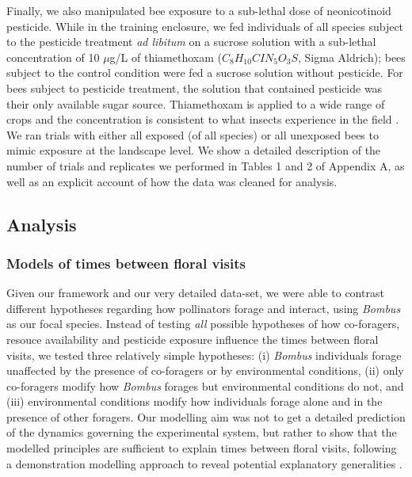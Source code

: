 \begin{refsection}
Finally, we also manipulated bee exposure to a sub-lethal dose of neonicotinoid pesticide. While in the training enclosure, we fed individuals of all species subject to the pesticide treatment \textit{ad libitum} on a sucrose solution with a sub-lethal concentration of 10 $\mu$g/L of thiamethoxam ($C_{8}H_{10}CIN_{5}O_{3}S$, Sigma Aldrich); bees subject to the control condition were fed a sucrose solution without pesticide. For bees subject to pesticide treatment, the solution that contained pesticide was their only available sugar source. Thiamethoxam is applied to a wide range of crops \citep{maienfisch_chemistry_2001} and the concentration is consistent to what insects experience in the field \citep{blacquiere_neonicotinoids_2012}. We ran trials with either all exposed (of all species) or all unexposed bees to mimic exposure at the landscape level. We show a detailed description of the number of trials and replicates we performed in Tables 1 and 2 of Appendix A, as well as an explicit account of how the data was cleaned for analysis.

\subsection*{Analysis}

\subsubsection*{Models of times between floral visits}

Given our framework and our very detailed data-set, we were able to contrast different hypotheses regarding how pollinators forage and interact, using \textit{Bombus} as our focal species. Instead of testing \textit{all} possible hypotheses of how co-foragers, resouce availability and pesticide exposure influence the times between floral visits, we tested three relatively simple hypotheses: (i) \textit{Bombus} individuals forage unaffected by the presence of co-foragers or by environmental conditions, (ii) only co-foragers modify how \textit{Bombus} forages but environmental conditions do not, and (iii) environmental conditions modify how individuals forage alone and in the presence of other foragers. Our modelling aim was not to get a detailed prediction of the dynamics governing the experimental system, but rather to show that the modelled principles are sufficient to explain times between floral visits, following a demonstration modelling approach to reveal potential explanatory generalities \citep{evans2013simple}.



\end{refsection}

